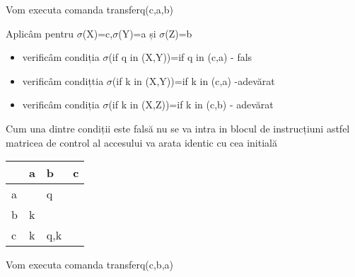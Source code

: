 \documentclass{article}
\begin{document}
Vom executa comanda transferq(c,a,b)

Aplicâm pentru $\sigma$(X)=c,$\sigma$(Y)=a și $\sigma$(Z)=b
    \begin{itemize}
        \item verificâm condiția $\sigma$(if q in (X,Y))=if q in (c,a) - fals
        \item verificâm condițtia $\sigma$(if k in (X,Y))=if k in (c,a) -adevărat
        \item verificâm condiția $\sigma$(if k in (X,Z))=if k in (c,b) - adevărat
    \end{itemize}
    \pagebreak
    Cum una dintre condiții este falsă nu se va intra in blocul de instrucțiuni astfel matricea de control al accesului va arata identic cu cea initială
    \begin{center}
        \begin{tabular}{|l|l|l|l|} 
            \hline
              & a & b   & c  \\ 
            \hline
            a &   & q   &    \\ 
            \hline
            b & k &     &    \\ 
            \hline
            c & k & q,k &    \\
            \hline
            \end{tabular}
        \end{center} 
        
        
Vom executa comanda transferq(c,b,a)
\end{document}
